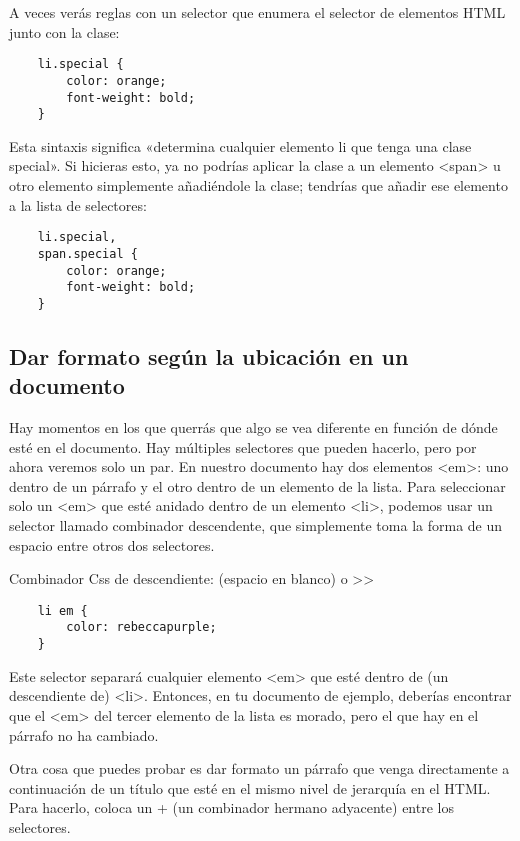 A veces verás reglas con un selector que enumera el selector de elementos HTML junto con la clase:

\begin{lstlisting}
	li.special {
		color: orange;
		font-weight: bold;
	}
\end{lstlisting}

Esta sintaxis significa «determina cualquier elemento li que tenga una clase special». Si hicieras esto, ya no podrías aplicar la clase a un elemento <span> u otro elemento simplemente añadiéndole la clase; tendrías que añadir ese elemento a la lista de selectores:

\begin{lstlisting}
	li.special,
	span.special {
		color: orange;
		font-weight: bold;
	}
\end{lstlisting}

\subsection{Dar formato según la ubicación en un documento}
Hay momentos en los que querrás que algo se vea diferente en función de dónde esté en el documento. Hay múltiples selectores que pueden hacerlo, pero por ahora veremos solo un par. En nuestro documento hay dos elementos <em>: uno dentro de un párrafo y el otro dentro de un elemento de la lista. Para seleccionar solo un <em> que esté anidado dentro de un elemento <li>, podemos usar un selector llamado combinador descendente, que simplemente toma la forma de un espacio entre otros dos selectores.

\begin{remark}
Combinador Css de descendiente: (espacio en blanco) o >>
\end{remark}

\begin{lstlisting}
	li em {
		color: rebeccapurple;
	}
\end{lstlisting}

Este selector separará cualquier elemento <em> que esté dentro de (un descendiente de) <li>. Entonces, en tu documento de ejemplo, deberías encontrar que el <em> del tercer elemento de la lista es morado, pero el que hay en el párrafo no ha cambiado.


Otra cosa que puedes probar es dar formato un párrafo que venga directamente a continuación de un título que esté en el mismo nivel de jerarquía en el HTML. Para hacerlo, coloca un + (un combinador hermano adyacente) entre los selectores.

